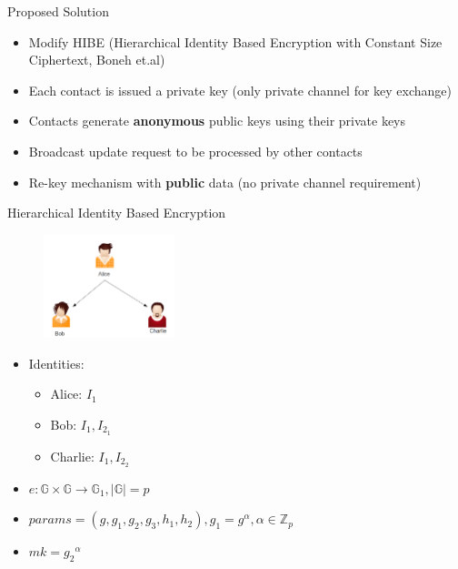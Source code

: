 \documentclass{beamer}
\begin{document}
\begin{frame}{Proposed Solution}
\begin{itemize}
\item Modify HIBE (Hierarchical Identity Based Encryption with
Constant Size Ciphertext, Boneh et.al)
\item Each contact is issued a private key (only private channel for key exchange)
\item Contacts generate \textbf{anonymous} public keys using their private keys
\item Broadcast update request to be processed by other contacts 
\item Re-key mechanism with \textbf{public} data (no private channel requirement)
\end{itemize}
\end{frame}

\begin{frame}{Hierarchical Identity Based Encryption}
\begin{figure}
\includegraphics[height=3cm]{img/img3.png} 
\end{figure}
\begin{itemize}
\item Identities:
 \begin{itemize}
	\item Alice: $I_1$
	\item Bob: $I_1,I_{2_1}$
	\item Charlie: $I_1,I_{2_2}$
\end{itemize}
\item $e : \mathbb{G} \times \mathbb{G} \to \mathbb{G}_1 , |\mathbb{G}| = p$
\item $params = (g, g_1, g_2, g_3, h_1, h_2) ,  g_1 = g^\alpha , \alpha \in \mathbb{Z}_p$
\item $mk = {g_2}^\alpha$
\end{itemize}
\end{frame}
\end{document}
